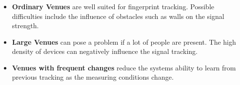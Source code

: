 \documentclass[12pt]{article}
\newcommand{\exercisepart}{\subsubsection{}}
\begin{document}
\exercisepart

\begin{itemize}
  \item \textbf{Ordinary Venues} are well suited for fingerprint tracking. Possible difficulties include the influence of obstacles such as walls on the signal strength.
  \item \textbf{Large Venues} can pose a problem if a lot of people are present. The high density of devices can negatively influence the signal tracking.
  \item \textbf{Venues with frequent changes} reduce the systems ability to learn from previous tracking as the measuring conditions change.
\end{itemize}
\end{document}
